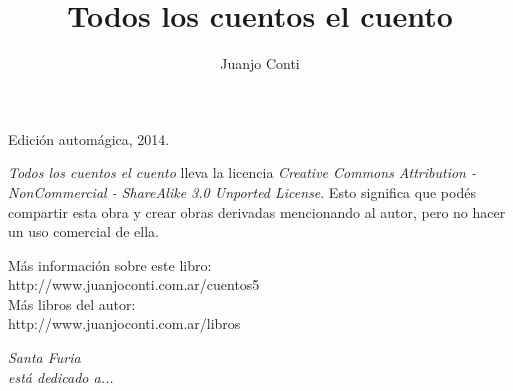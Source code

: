 \documentclass[12pt,twoside,openright,a5paper]{book}
\title{Todos los cuentos el cuento}
\author{Juanjo Conti}
\date{}
\begin{document}
\pagestyle{plain}

\maketitle

\cleardoublepage

\thispagestyle{empty}
\noindent
Edición automágica, 2014.\\

\vspace{0.5cm}

\noindent
\emph{Todos los cuentos el cuento} lleva la licencia 
\emph{Creative Commons Attribution - NonCommercial - ShareAlike 3.0 Unported License}.
Esto significa que podés compartir esta obra y crear obras derivadas
mencionando al autor, pero no ha\-cer un uso comercial de ella.

\vfill

\noindent
Más información sobre este libro:\\
http://www.juanjoconti.com.ar/cuentos5\\

\noindent
Más libros del autor:\\
http://www.juanjoconti.com.ar/libros

\cleardoublepage

\noindent
\begin{flushright}
\emph{
\emph{Santa Furia}\\
está dedicado a...
}
\end{flushright}

\cleardoublepage

\renewcommand*\contentsname{Índice}

\tableofcontents

 
 
 
 
 
 
 
 
 
 
 
 
 
 
 
 
 
 
 
 
 
 
 
 
 
\end{document}
